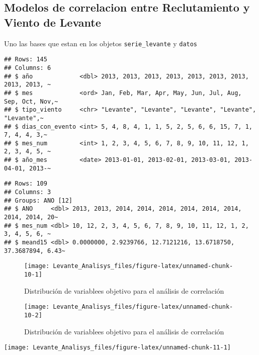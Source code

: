 \documentclass[
]{article}
\begin{document}
\subsection{Modelos de correlacion entre Reclutamiento y Viento de Levante}\label{modelos-de-correlacion-entre-reclutamiento-y-viento-de-levante}

Uno las bases que estan en los objetos \texttt{serie\_levante} y \texttt{datos}

\begin{verbatim}
## Rows: 145
## Columns: 6
## $ año             <dbl> 2013, 2013, 2013, 2013, 2013, 2013, 2013, 2013, 2013, ~
## $ mes             <ord> Jan, Feb, Mar, Apr, May, Jun, Jul, Aug, Sep, Oct, Nov,~
## $ tipo_viento     <chr> "Levante", "Levante", "Levante", "Levante", "Levante",~
## $ dias_con_evento <int> 5, 4, 8, 4, 1, 1, 5, 2, 5, 6, 6, 15, 7, 1, 7, 4, 4, 3,~
## $ mes_num         <int> 1, 2, 3, 4, 5, 6, 7, 8, 9, 10, 11, 12, 1, 2, 3, 4, 5, ~
## $ año_mes         <date> 2013-01-01, 2013-02-01, 2013-03-01, 2013-04-01, 2013-~
\end{verbatim}

\begin{verbatim}
## Rows: 109
## Columns: 3
## Groups: ANO [12]
## $ ANO     <dbl> 2013, 2013, 2014, 2014, 2014, 2014, 2014, 2014, 2014, 2014, 20~
## $ mes_num <dbl> 10, 12, 2, 3, 4, 5, 6, 7, 8, 9, 10, 11, 12, 1, 2, 3, 4, 5, 6, ~
## $ meand15 <dbl> 0.0000000, 2.9239766, 12.7121216, 13.6718750, 37.3687894, 6.43~
\end{verbatim}

\begin{figure}

{\centering \texttt{[image: Levante\_Analisys\_files/figure-latex/unnamed-chunk-10-1]} 

}

\caption{Distribución de variablees objetivo para el análisis de correlación}\label{fig:unnamed-chunk-10-1}
\end{figure}
\begin{figure}

{\centering \texttt{[image: Levante\_Analisys\_files/figure-latex/unnamed-chunk-10-2]} 

}

\caption{Distribución de variablees objetivo para el análisis de correlación}\label{fig:unnamed-chunk-10-2}
\end{figure}

\begin{center}\texttt{[image: Levante\_Analisys\_files/figure-latex/unnamed-chunk-11-1]} \end{center}
\end{document}
